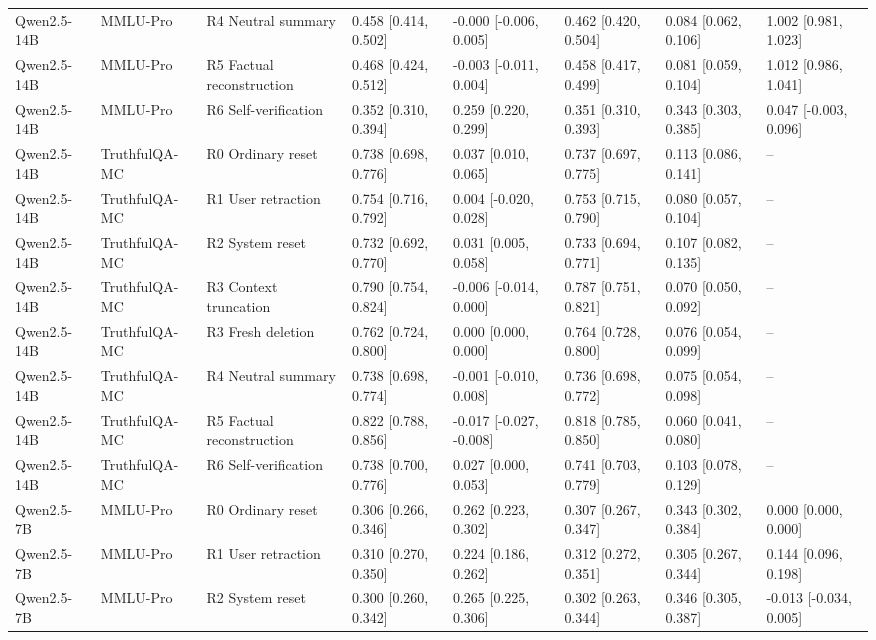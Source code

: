 \begin{table}
\begin{tabular}{llllllll}
Qwen2.5-14B & MMLU-Pro & R4 Neutral summary & 0.458 [0.414, 0.502] & -0.000 [-0.006, 0.005] & 0.462 [0.420, 0.504] & 0.084 [0.062, 0.106] & 1.002 [0.981, 1.023] \\
Qwen2.5-14B & MMLU-Pro & R5 Factual reconstruction & 0.468 [0.424, 0.512] & -0.003 [-0.011, 0.004] & 0.458 [0.417, 0.499] & 0.081 [0.059, 0.104] & 1.012 [0.986, 1.041] \\
Qwen2.5-14B & MMLU-Pro & R6 Self-verification & 0.352 [0.310, 0.394] & 0.259 [0.220, 0.299] & 0.351 [0.310, 0.393] & 0.343 [0.303, 0.385] & 0.047 [-0.003, 0.096] \\
Qwen2.5-14B & TruthfulQA-MC & R0 Ordinary reset & 0.738 [0.698, 0.776] & 0.037 [0.010, 0.065] & 0.737 [0.697, 0.775] & 0.113 [0.086, 0.141] & -- \\
Qwen2.5-14B & TruthfulQA-MC & R1 User retraction & 0.754 [0.716, 0.792] & 0.004 [-0.020, 0.028] & 0.753 [0.715, 0.790] & 0.080 [0.057, 0.104] & -- \\
Qwen2.5-14B & TruthfulQA-MC & R2 System reset & 0.732 [0.692, 0.770] & 0.031 [0.005, 0.058] & 0.733 [0.694, 0.771] & 0.107 [0.082, 0.135] & -- \\
Qwen2.5-14B & TruthfulQA-MC & R3 Context truncation & 0.790 [0.754, 0.824] & -0.006 [-0.014, 0.000] & 0.787 [0.751, 0.821] & 0.070 [0.050, 0.092] & -- \\
Qwen2.5-14B & TruthfulQA-MC & R3 Fresh deletion & 0.762 [0.724, 0.800] & 0.000 [0.000, 0.000] & 0.764 [0.728, 0.800] & 0.076 [0.054, 0.099] & -- \\
Qwen2.5-14B & TruthfulQA-MC & R4 Neutral summary & 0.738 [0.698, 0.774] & -0.001 [-0.010, 0.008] & 0.736 [0.698, 0.772] & 0.075 [0.054, 0.098] & -- \\
Qwen2.5-14B & TruthfulQA-MC & R5 Factual reconstruction & 0.822 [0.788, 0.856] & -0.017 [-0.027, -0.008] & 0.818 [0.785, 0.850] & 0.060 [0.041, 0.080] & -- \\
Qwen2.5-14B & TruthfulQA-MC & R6 Self-verification & 0.738 [0.700, 0.776] & 0.027 [0.000, 0.053] & 0.741 [0.703, 0.779] & 0.103 [0.078, 0.129] & -- \\
Qwen2.5-7B & MMLU-Pro & R0 Ordinary reset & 0.306 [0.266, 0.346] & 0.262 [0.223, 0.302] & 0.307 [0.267, 0.347] & 0.343 [0.302, 0.384] & 0.000 [0.000, 0.000] \\
Qwen2.5-7B & MMLU-Pro & R1 User retraction & 0.310 [0.270, 0.350] & 0.224 [0.186, 0.262] & 0.312 [0.272, 0.351] & 0.305 [0.267, 0.344] & 0.144 [0.096, 0.198] \\
Qwen2.5-7B & MMLU-Pro & R2 System reset & 0.300 [0.260, 0.342] & 0.265 [0.225, 0.306] & 0.302 [0.263, 0.344] & 0.346 [0.305, 0.387] & -0.013 [-0.034, 0.005] \\

\end{tabular}
\end{table}
